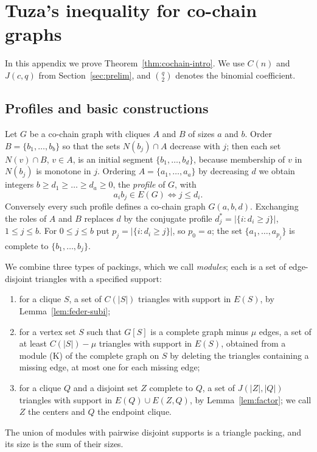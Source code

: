\documentclass{amsart}
\theoremstyle{definition}
\theoremstyle{remark}
\numberwithin{equation}{section}
\numberwithin{table}{section}
\begin{document}
\section{Tuza's inequality for co-chain graphs}\label{app:cochain}

In this appendix we prove Theorem~\ref{thm:cochain-intro}. We use $C(n)$ and $J(c,q)$ from Section~\ref{sec:prelim}, and $\binom q2$ denotes the binomial coefficient.

\subsection{Profiles and basic constructions}\label{ssec:profiles}
Let $G$ be a co-chain graph with cliques $A$ and $B$ of sizes $a$ and $b$. Order $B=\{b_1,\dots,b_b\}$ so that the sets $N(b_j)\cap A$ decrease with $j$; then each set $N(v)\cap B$, $v\in A$, is an initial segment $\{b_1,\dots,b_{d}\}$, because membership of $v$ in $N(b_j)$ is monotone in $j$. Ordering $A=\{a_1,\dots,a_a\}$ by decreasing $d$ we obtain integers $b\ge d_1\ge\dots\ge d_a\ge0$, the \emph{profile} of $G$, with
\[
a_ib_j\in E(G)\iff j\le d_i .
\]
Conversely every such profile defines a co-chain graph $G(a,b,d)$. Exchanging the roles of $A$ and $B$ replaces $d$ by the conjugate profile $d^*_j=|\{i:d_i\ge j\}|$, $1\le j\le b$. For $0\le j\le b$ put $p_j=|\{i:d_i\ge j\}|$, so $p_0=a$; the set $\{a_1,\dots,a_{p_j}\}$ is complete to $\{b_1,\dots,b_j\}$.

We combine three types of packings, which we call \emph{modules}; each is a set of edge-disjoint triangles with a specified support:
\begin{enumerate}
\item[(K)] for a clique $S$, a set of $C(|S|)$ triangles with support in $E(S)$, by Lemma~\ref{lem:feder-subi};
\item[(K$^-$)] for a vertex set $S$ such that $G[S]$ is a complete graph minus $\mu$ edges, a set of at least $C(|S|)-\mu$ triangles with support in $E(S)$, obtained from a module (K) of the complete graph on $S$ by deleting the triangles containing a missing edge, at most one for each missing edge;
\item[(J)] for a clique $Q$ and a disjoint set $Z$ complete to $Q$, a set of $J(|Z|,|Q|)$ triangles with support in $E(Q)\cup E(Z,Q)$, by Lemma~\ref{lem:factor}; we call $Z$ the centers and $Q$ the endpoint clique.
\end{enumerate}
The union of modules with pairwise disjoint supports is a triangle packing, and its size is the sum of their sizes.
\end{document}
